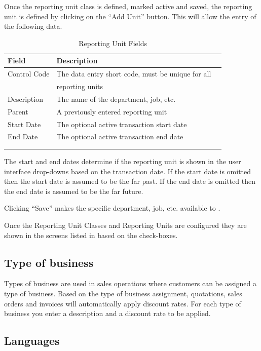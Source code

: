  \newpage %
Once the reporting unit class is defined, marked active and saved, the reporting unit is defined by
clicking on the ``Add Unit'' button. This will allow the entry of the following data.
\begin{longtable}{ llp{6cm} }
	Field  & Description \\ \hline
	\endhead
	Control Code & The data entry short code, must be unique for all\\
		 & reporting units\\
	Description & The name of the department, job, etc. \\
	Parent & A previously entered reporting unit\\
	Start Date &  The optional active transaction start date\\
	End Date &  The optional active transaction end date\\
	\\
	\caption{Reporting Unit Fields}
	\label{fig:subsec-company-config-reporting-unit-fields}
\end{longtable}

The start and end dates determine if the reporting unit is shown in the user interface drop-downs based on the transaction date.
If the start date is omitted then the start date is assumed to be the far past.
If the end date is omitted then the end date is assumed to be the far future.

Clicking ``Save'' makes the specific department, job, etc. available to \lsmb.

Once the Reporting Unit Classes and Reporting Units are configured they are shown in the screens listed in  based on the check-boxes.

\subsection{Type of business}
\label{subsec-company-config-business-types}

Types of business are used in sales operations where customers can be assigned a type
of business. Based on the type of business assignment, quotations, sales orders and
invoices will automatically apply discount rates. For each type of business you enter a description and a discount rate to be applied.

\subsection{Languages}
\label{subsec-company-config-languages}

